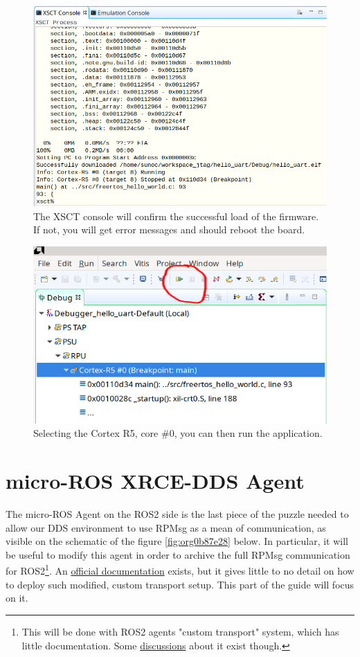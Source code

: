 \documentclass[10pt]{article}
\begin{document}
\begin{figure}[htbp]
\centering
\includegraphics[width=.6\textwidth]{./img/jtag/console.png}
\caption{\label{fig:orga883ce9}The XSCT console will confirm the successful load of the firmware. If not, you will get error messages and should reboot the board.}
\end{figure}

\begin{figure}[htbp]
\centering
\includegraphics[width=.6\textwidth]{./img/jtag/run.png}
\caption{\label{fig:orgc392327}Selecting the Cortex R5, core \#0, you can then run the application.}
\end{figure}

\clearpage
\section{micro-ROS XRCE-DDS Agent}
\label{sec:org11c0cec}
The micro-ROS Agent on the ROS2 side is the last piece of the puzzle needed to
allow our DDS environment to use RPMsg as a mean of communication, as visible
on the schematic of the figure \ref{fig:org0b87e28} below.
In particular, it will be useful to modify this agent in order to archive
the full RPMsg communication for ROS2\footnote{This will be done with ROS2 agents "custom transport"  system,
which has little documentation. Some \href{https://github.com/micro-ROS/micro\_ros\_setup/issues/383}{discussions} about it exist though.}.
An \href{https://micro.ros.org/docs/tutorials/advanced/create\_custom\_transports/}{official documentation} exists, but it gives little to no detail
on how to deploy such modified, custom transport setup.
This part of the guide will focus on it.
\end{document}
